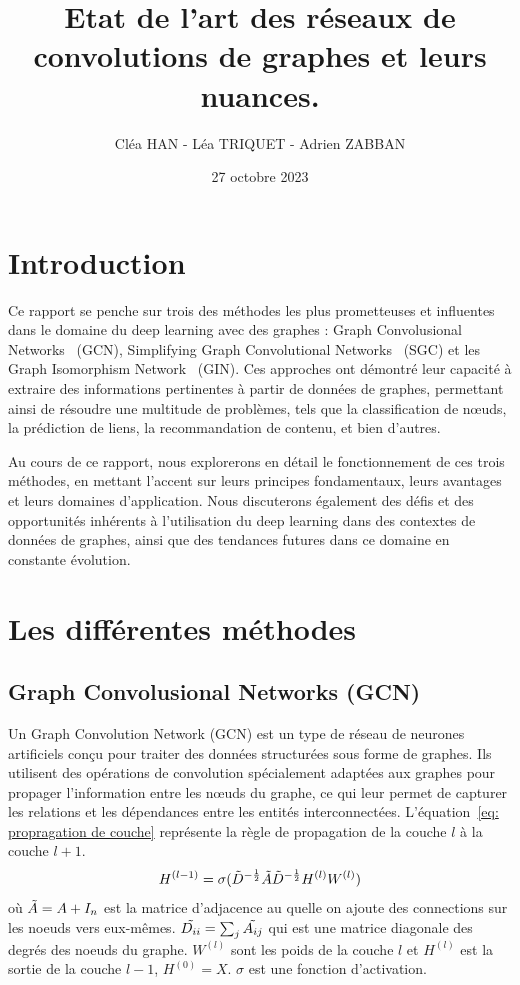 \documentclass[a4paper]{article}
\title{Etat de l'art des réseaux de convolutions de graphes et leurs nuances.}
\author{Cléa HAN - Léa TRIQUET - Adrien ZABBAN}
\date{27 octobre 2023}
\begin{document}
\maketitle

\section{Introduction}

Ce rapport se penche sur trois des méthodes les plus prometteuses et influentes dans le domaine du deep learning avec des graphes :
Graph Convolusional Networks~\cite{DBLP:journals/corr/KipfW16} (GCN), Simplifying Graph Convolutional 
Networks~\cite{DBLP:journals/corr/abs-1902-07153}
(SGC) et les  Graph Isomorphism Network~\cite{DBLP:journals/corr/abs-1810-00826} (GIN). Ces approches ont démontré leur capacité 
à extraire des informations pertinentes à partir de données de graphes, permettant ainsi de résoudre une multitude de problèmes, 
tels que la classification de nœuds, la prédiction de liens, la recommandation de contenu, et bien d'autres.

Au cours de ce rapport, nous explorerons en détail le fonctionnement de ces trois méthodes, en mettant l'accent sur leurs principes 
fondamentaux, leurs avantages et leurs domaines d'application. Nous discuterons également des défis et des opportunités inhérents à 
l'utilisation du deep learning dans des contextes de données de graphes, ainsi que des tendances futures dans ce domaine en constante
évolution.

\section{Les différentes méthodes}

\subsection{Graph Convolusional Networks (GCN)}\label{sec: GCN}
Un Graph Convolution Network (GCN) est un type de réseau de neurones artificiels conçu pour traiter des données 
structurées sous forme de graphes. Ils utilisent des opérations de convolution spécialement adaptées aux graphes 
pour propager l'information entre les nœuds du graphe, ce qui leur permet de capturer les relations et les 
dépendances entre les entités interconnectées. L'équation~\ref{eq: propragation de couche} représente la règle de
propagation de la couche $l$ à la couche $l+1$.
\begin{equation}
    H^{(l-1)} = \sigma (\Tilde{D}^{-\frac{1}{2}} \Tilde{A} \Tilde{D}^{-\frac{1}{2}} H^{(l)} W^{(l)})
    \label{eq: propragation de couche}
\end{equation}
où $\Tilde{A}=A+I_n$ est la matrice d'adjacence au quelle on ajoute des connections sur les noeuds vers 
eux-mêmes. $\Tilde{D_{ii}}=\sum_j{\Tilde{A_{ij}}}$ qui est une matrice diagonale des degrés des noeuds du 
graphe. $W^{(l)}$ sont les poids de la couche $l$ et $H^{(l)}$ est la sortie de la couche $l-1$, $H^{(0)}=X$. 
$\sigma$ est une fonction d'activation.
\end{document}
